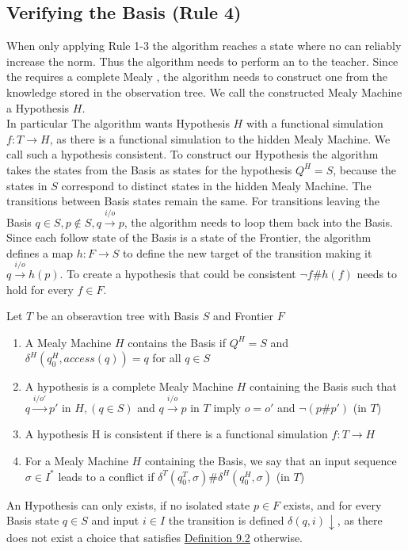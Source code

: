 \subsection{Verifying the Basis (Rule 4)}
When only applying Rule 1-3 the algorithm reaches a state where no \oquery\space can reliably increase the norm. Thus the algorithm needs to perform an \equery\space to the teacher. Since the \equery\space requires a complete Mealy , the algorithm needs to construct one from the knowledge stored in the observation tree. We call the constructed Mealy Machine a Hypothesis $H$.\\
In particular The algorithm wants Hypothesis $H$ with a functional simulation $f:T\rightarrow H$, as there is a functional simulation to the hidden Mealy Machine. We call such a hypothesis consistent. To construct our Hypothesis the algorithm takes the states from the Basis as states for the hypothesis $Q^H=S $, because the states in $S$ correspond to distinct states in the hidden Mealy Machine. The transitions between Basis states remain the same. For transitions leaving the Basis $q\in S, p\notin S, q\xrightarrow{i/o}p$, the algorithm needs to loop them back into the Basis. Since each follow state of the Basis is a state of the Frontier, the algorithm defines a map $h:F\rightarrow S$ to define the new target of the transition making it $q\xrightarrow{i/o}h(p)$. To create a hypothesis that could be consistent $\neg f\#h(f)$ needs to hold for every $f\in F$. 
\begin{definition} \label{def:hypo}
	Let $T$ be an obseravtion tree with Basis $S$ and Frontier $F$
	\begin{enumerate}
		\item A Mealy Machine $H$ contains the Basis if $Q^H=S$ and $\delta^H(q_0^H,access(q))=q$ for all $q\in S$
		\item\label{def:hypo:two} A hypothesis is a complete Mealy Machine $H$ containing the Basis such that $q\xrightarrow{i/o'}p'$ in $H, (q\in S)$ and $q\xrightarrow{i/o}p$ in $T$ imply $o=o'$ and $\neg (p\#p')$ (in $T$)
		\item A hypothesis H is consistent if there is a functional simulation $f:T\rightarrow H$
		\item For a Mealy Machine $H$ containing the Basis, we say that an input sequence $\sigma\in I^*$ leads to a conflict if $\delta^T(q_0^T,\sigma)\#\delta^H(q_0^H,\sigma)$ (in $T$)
	\end{enumerate}
\end{definition}
An Hypothesis can only exists, if no isolated state $p\in F$ exists, and for every Basis state $q\in S$ and input $i\in I$ the transition is defined $\delta(q,i)\downarrow$, as there does not exist a choice that satisfies \hyperref[def:hypo:two]{Definition 9.2} otherwise. 


